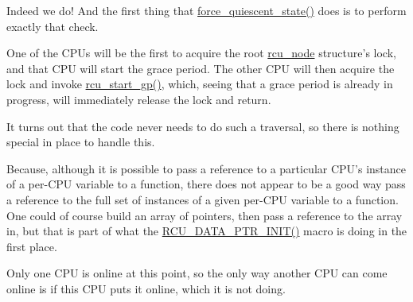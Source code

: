
	Indeed we do!
	And the first thing that \url{force_quiescent_state()} does
	is to perform exactly that check.


	One of the CPUs will be the first to acquire the root
	\url{rcu_node} structure's lock, and that CPU will start
	the grace period.
	The other CPU will then acquire the lock and invoke
	\url{rcu_start_gp()}, which, seeing that a grace period
	is already in progress, will immediately release the
	lock and return.


	It turns out that the code never needs to do such a traversal,
	so there is nothing special in place to handle this.


	Because, although it is possible to pass a reference to
	a particular CPU's instance of a per-CPU variable to a function,
	there does not appear to be a good way pass a reference to
	the full set of instances of a given per-CPU variable to
	a function.
	One could of course build an array of pointers, then pass a
	reference to the array in, but that is part of what
	the \url{RCU_DATA_PTR_INIT()} macro is doing in the first place.


	Only one CPU is online at this point, so the only way another
	CPU can come online is if this CPU puts it online, which it
	is not doing.


